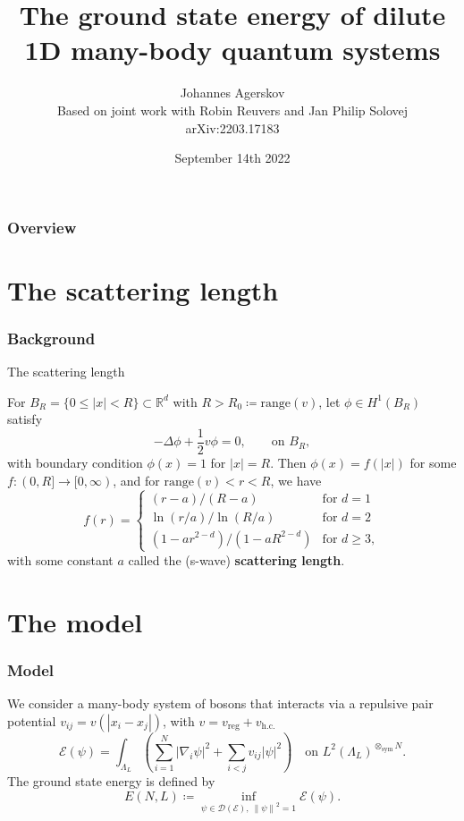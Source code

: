 \documentclass{beamer}[10]
\title{The ground state energy of dilute 1D many-body quantum systems}
\subtitle{}
\author{Johannes Agerskov\\\vspace{0.2 cm}
	\scriptsize{Based on joint work with Robin Reuvers and Jan Philip Solovej\\
		arXiv:2203.17183}}
\institute{QMATH \\ University of Copenhagen}
\date{September 14th 2022}
\newcommand{\norm}[1]{\left\lVert #1 \right\rVert}
\newcommand{\abs}[1]{\left\lvert #1 \right\rvert}
\newcommand{\R}{\mathbb{R}}
\begin{document}
\frame{\titlepage \vspace{-0.5cm}
}

\frame
{
\frametitle{Overview}
\tableofcontents%
}

\section{The scattering length}

\begin{frame}
\frametitle{Background}
\vspace*{-0.2cm}
\begin{block}{The scattering length}
	\vspace*{-0.4cm}
	\small\begin{theorem}
		For $ B_R=\{0\leq\abs{x}<R\}\subset \R^d $ with $ R>R_0\coloneqq\text{range}(v) $, let $ \phi\in H^1(B_{R}) $ satisfy
	 \begin{equation}
		 -\Delta \phi +\frac12 v\phi=0,\qquad \text{on }B_R,
		 \end{equation}
		 with boundary condition $ \phi(x)=1 $ for $ \abs{x}=R$.
		 Then $ \phi(x)=f(\abs{x}) $ for some $ f:(0,R]\to [0,\infty) $, and for $ \text{range}(v)<r<R $, we have \begin{equation}
		 f(r)=\begin{cases}
		 (r-a)/(R-a) &\text{for }d=1\\
		 \ln(r/a)/\ln(R/a) &\text{for }d=2\\
		 (1-ar^{2-d})/(1-aR^{2-d})&\text{for }d\geq 3,
		 \end{cases}
		 \end{equation}
		 with some constant $ a $ called the (s-wave) \textbf{scattering length}.
	\end{theorem}
\end{block}	
\end{frame}
\section{The model}
\begin{frame}
	\frametitle{Model}
	We consider a many-body system of bosons that interacts via a repulsive pair potential $ v_{ij}=v(\abs{x_i-x_j}) $, with $ v=v_{\text{reg}}+v_{\text{h.c.}} $\begin{equation}
	\mathcal{E}(\psi)=\int_{\Lambda_L}\left(\sum_{i=1}^{N}\abs{\nabla_i\psi}^2+\sum_{i<j} v_{ij}\abs{\psi}^2\right)\quad \text{on } L^2(\Lambda_L)^{\otimes_{\text{sym}} N}.
	\end{equation}
	The ground state energy is defined by 
	$$
	E(N,L)\coloneqq\inf_{\psi\in\mathcal{D}(\mathcal{E}),\ \norm{\psi}^2=1}\mathcal{E}(\psi).
	$$
\end{frame}
\end{document}
